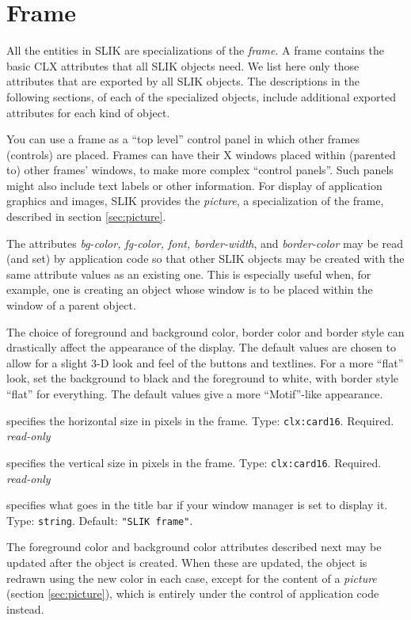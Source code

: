 \documentclass[twoside,openright,11pt]{report}
\newcommand{\tp}[1]{\texttt{#1}}
\begin{document}
\section{Frame}

All the entities in SLIK are specializations of the \textit{frame}.  A
frame contains the basic CLX attributes that all SLIK
objects need.  We list here only those attributes that are exported by
all SLIK objects.  The descriptions in the following sections, of each
of the specialized objects, include additional exported attributes for
each kind of object.

You can use a frame as a ``top level'' control panel in which other
frames (controls) are placed.  Frames can have their X windows placed
within (parented to) other frames' windows, to make more complex
``control panels''.  Such panels might also include text labels or
other information.  For display of application graphics and images,
SLIK provides the \emph{picture}, a specialization of the frame,
described in section \ref{sec:picture}.

The attributes \emph{bg-color, fg-color, font, border-width}, and
\emph{border-color} may be read (and set) by application code so that
other SLIK objects may be created with the same attribute values as an
existing one.  This is especially useful when, for example, one is
creating an object whose window is to be placed within the window of a
parent object.

The choice of foreground and background color, border color and border
style can drastically affect the appearance of the display.  The
default values are chosen to allow for a slight 3-D look and feel of
the buttons and textlines.  For a more ``flat'' look, set the
background to black and the foreground to white, with border style
``flat'' for everything.  The default values give a more
``Motif''-like appearance.


{specifies the horizontal size in pixels in the frame.  Type:
\tp{clx:card16}.  Required.  \textit{read-only}}

{specifies the vertical size in pixels in the frame.  Type:
\tp{clx:card16}.  Required.  \textit{read-only}}

{specifies what goes in the title bar if your window manager is set to
display it.  Type: \tp{string}.  Default: \tp{"SLIK frame"}.}

The foreground color and background color attributes described next
may be updated after the object is created.  When these are updated,
the object is redrawn using the new color in each case, except for the
content of a \emph{picture} (section \ref{sec:picture}), which is
entirely under the control of application code instead.
\end{document}
